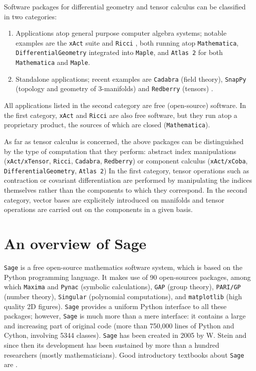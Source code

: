 \documentclass[a4paper]{jpconf}
\newcommand{\soft}[1]{\texttt{#1}}
\newcommand{\Sage}{\soft{Sage}}
\begin{document}
Software packages for differential geometry and tensor calculus can be 
classified in two categories: 
\begin{enumerate}
\item Applications atop general purpose computer algebra systems; 
notable examples are 
the \soft{xAct} suite \cite{Marti08,xAct} and \soft{Ricci} \cite{Ricci}, both
running atop \soft{Mathematica},
\soft{DifferentialGeometry} \cite{AnderT12,DiffGeom} integrated into \soft{Maple}, and \soft{Atlas 2}
\cite{Atlas2} for both \soft{Mathematica} and \soft{Maple}.
\item Standalone applications; recent examples are \soft{Cadabra} \cite{Peete07,Cadabra} (field theory),
\soft{SnapPy} \cite{SnapPy} (topology and geometry of 3-manifolds) and
\soft{Redberry} (tensors) \cite{BolotP13,Redberry}.
\end{enumerate}
All applications listed in the second category are free (open-source) software. In
the first category, \soft{xAct} and \soft{Ricci} are also free software, but
they run atop a proprietary product, the sources of which are closed (\soft{Mathematica}). 

As far as tensor calculus is concerned, the above packages can be distinguished by 
the type of computation that they perform: abstract index manipulations 
(\soft{xAct/xTensor}, \soft{Ricci}, \soft{Cadabra}, \soft{Redberry})
or component calculus (\soft{xAct/xCoba}, \soft{DifferentialGeometry}, \soft{Atlas 2})
In the first category, tensor operations such as contraction or covariant differentiation 
are performed by manipulating the indices themselves rather than the components 
to which they correspond. In the second category, vector bases are explicitely 
introduced on manifolds and tensor operations are carried out on the components 
in a given basis.



\section{An overview of Sage}

\Sage{} \cite{sage} is a free open-source mathematics software system, which is
based on the Python programming language. It makes use of 90 open-sources packages, 
among which \soft{Maxima} and \soft{Pynac} (symbolic calculations),
\soft{GAP} (group theory), 
\soft{PARI/GP} (number theory), \soft{Singular} (polynomial computations), 
and \soft{matplotlib} (high quality 2D figures). 
\Sage{} provides a uniform Python interface to all these packages; however, 
\Sage{} is much more than a mere interface: it contains a large and increasing part of 
original code (more than 750,000 lines of Python and Cython, involving 5344 classes). 
\Sage{} has been created in 2005 by W. Stein \cite{SteinJ05} and since
then its development has been sustained by more than a hundred researchers
(mostly mathematicians). Good introductory textbooks about \Sage{} are
\cite{JoyneS14,Zimme13,Bard15}. 
 
\end{document}
